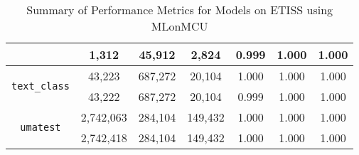 \begin{sidewaystable}[h!]
\begin{tabular}{|c|c|c|c|c|c|c|}
                                              & 1,312 & 45,912 & 2,824 & 0.999 & 1.000 & 1.000 \\
        \cline{2-7}
        \hline
        \multirow{2}{*}{\texttt{text\_class}} & 43,223 & 687,272 & 20,104 & 1.000 & 1.000 & 1.000 \\
                                              & 43,222 & 687,272 & 20,104 & 0.999 & 1.000 & 1.000 \\
        \cline{2-7}
        \hline
        \multirow{2}{*}{\texttt{umatest}} & 2,742,063 & 284,104 & 149,432 & 1.000 & 1.000 & 1.000 \\
                                          & 2,742,418 & 284,104 & 149,432 & 1.000 & 1.000 & 1.000 \\
        \cline{2-7}
        \hline
    \end{tabular}
    \caption{Summary of Performance Metrics for Models on ETISS using MLonMCU}
\end{sidewaystable}

